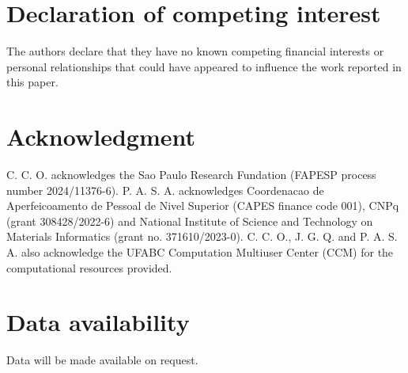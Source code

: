 \documentclass[a4paper,fleqn]{cas-dc}
\begin{document}

\section*{Declaration of competing interest}
The authors declare that they have no known competing financial interests or personal relationships that could have appeared to influence the work reported in this paper.

\section*{Acknowledgment}

C. C. O. acknowledges the Sao Paulo Research Fundation (FAPESP process number 2024/11376-6). P. A. S. A. acknowledges Coordenacao de Aperfeicoamento de Pessoal de Nivel Superior (CAPES finance code 001), CNPq (grant 308428/2022-6) and National Institute of Science and Technology on Materials Informatics (grant no. 371610/2023-0). C. C. O., J. G. Q. and P. A. S. A. also acknowledge the UFABC Computation Multiuser Center (CCM) for the computational resources provided.

\section*{Data availability}
Data will be made available on request.




\end{document}
